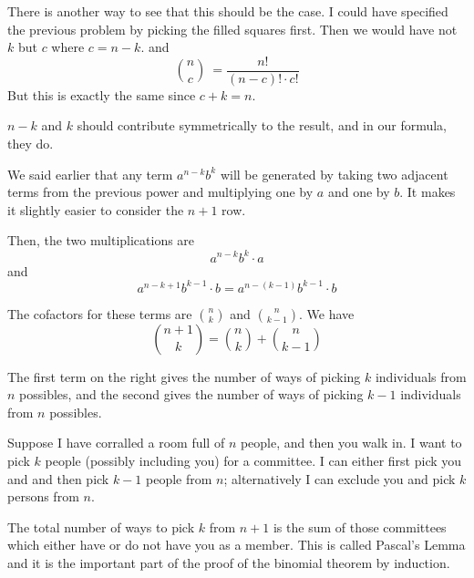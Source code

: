 \documentclass[11pt, oneside]{article}
\begin{document}
There is another way to see that this should be the case.  I could have specified the previous problem by picking the filled squares first.  Then we would have not $k$ but $c$ where $c = n - k$. and
\[ \binom{n}{c} \ = \frac{n!}{(n-c)! \cdot c!} \]
But this is exactly the same since $c + k = n$.

$n-k$ and $k$ should contribute symmetrically to the result, and in our formula, they do.

We said earlier that any term $a^{n-k}b^k$ will be generated by taking two adjacent terms from the previous power and multiplying one by $a$ and one by $b$.  It makes it slightly easier to consider the $n+1$ row.

Then, the two multiplications are
\[ a^{n-k}b^k \cdot a \]
and
\[ a^{n-k+1}b^{k-1} \cdot b = a^{n-(k-1)}b^{k-1} \cdot b \]

The cofactors for these terms are $\binom{n}{k}$ and $\binom{n}{k-1}$.  We have
\[ \binom{n+1}{k} = \binom{n}{k} + \binom{n}{k-1} \]

The first term on the right gives the number of ways of picking $k$ individuals from $n$ possibles, and the second gives the number of ways of picking $k-1$ individuals from $n$ possibles.  

Suppose I have corralled a room full of $n$ people, and then you walk in.  I want to pick $k$ people (possibly including you) for a committee.  I can either first pick you and and then pick $k-1$ people from $n$;  alternatively I can exclude you and pick $k$ persons from $n$.  

The total number of ways to pick $k$ from $n+1$ is the sum of those committees which either have or do not have you as a member.  This is called Pascal's Lemma and it is the important part of the proof of the binomial theorem by induction.
\end{document}
